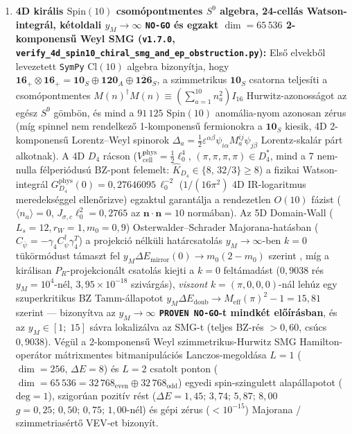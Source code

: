\documentclass[11pt,a4paper]{article}
\begin{document}
\begin{enumerate}
    Így \emph{minden} általános (nem-szimmetrikus) $W(F_4)$-invariáns 4-es rendű direktor-kinetikus tenzor automatikusan 4D euklideszi $O(4)$-izotróp mindhárom független $c_1, c_2, c_3$ kontrakcióra (kizárva a hiperkockás $\sum_\alpha(\partial_\alpha u_\alpha)^2$ ellentagokat; $D_4$-gyök ellenőrzés $4{,}44\times 10^{-16}$), míg az első $W(F_4)$ anizotrópia ($16 > 15$) csak 6-os rendben ($c_4$-típusú gyorsulási tagokban) lép be. A Lorentz-aláírású $SO(3,1)$ kontinuum a Paper~27 Wick-forgatásos/EFT előírására támaszkodik.
    \item \textbf{4D királis $\mathrm{Spin}(10)$ csomópontmentes $S^9$ algebra, 24-cellás Watson-integrál, kétoldali $y_M\to\infty$ \texttt{NO-GO} és egzakt $\dim = 65\,536$ 2-komponensű Weyl SMG (\texttt{v1.7.0}, \texttt{verify\_\allowbreak 4d\_\allowbreak spin10\_\allowbreak chiral\_\allowbreak smg\_\allowbreak and\_\allowbreak ep\_\allowbreak obstruction.py}):}
    Első elvekből levezetett \texttt{SymPy} $\mathrm{Cl}(10)$ algebra bizonyítja, hogy $\mathbf{16}_+\otimes\mathbf{16}_+=\mathbf{10}_S\oplus\mathbf{120}_A\oplus\overline{\mathbf{126}}_S$, a szimmetrikus $\mathbf{10}_S$ csatorna teljesíti a csomópontmentes $M(n)^\dagger M(n)\equiv(\sum_{a=1}^{10} n_a^2)I_{16}$ Hurwitz-azonosságot az egész $S^9$ gömbön, és mind a $91\,125$ $\mathrm{Spin}(10)$ anomália-nyom azonosan zérus (míg spinnel nem rendelkező 1-komponensű fermionokra a $\mathbf{10}_S$ kiesik, 4D 2-komponensű Lorentz--Weyl spinorok $\Delta_a=\frac{1}{2}\varepsilon^{\alpha\beta}\psi_{i\alpha}M_a^{ij}\psi_{j\beta}$ Lorentz-skalár párt alkotnak). A 4D $D_4$ rácson ($V_{\mathrm{cell}}^{\mathrm{phys}}=\frac{1}{2}\ell_0^4$, $(\pi,\pi,\pi,\pi)\in D_4^*$, mind a 7 nem-nulla félperiódusú BZ-pont felemelt: $\hat K_{D_4}\in\{8,\,32/3\}\ge 8$) a fizikai Watson-integrál $G_{D_4}^{\mathrm{phys}}(0)=0{,}27646095\,\ell_0^{-2}$ ($1/(16\pi^2)$ 4D IR-logaritmus meredekséggel ellenőrizve) egzaktul garantálja a rendezetlen $O(10)$ fázist ($\langle n_a\rangle=0$, $J_{\sigma,c}\ell_0^2=0{,}2765$ az $\mathbf{n}\cdot\mathbf{n}=10$ normában). Az 5D Domain-Wall ($L_s=12, r_W=1, m_0=0{,}9$) Osterwalder--Schrader Majorana-hatásban ($C_{\bar\psi}=-\gamma_4 C_\psi^\dagger\gamma_4^T$) a projekció nélküli határcsatolás $y_M\to\infty$-ben $k=0$ tükörmódust támaszt fel $y_M\Delta E_{\mathrm{mirror}}(0)\to m_0(2-m_0)$ szerint \cite{Golterman1993}, míg a királisan $P_R$-projekcionált csatolás kiejti a $k=0$ feltámadást ($0{,}9038$ rés $y_M=10^4$-nél, $3{,}95\times 10^{-18}$ szivárgás), \emph{viszont} $k=(\pi,0,0,0)$-nál lehúz egy szuperkritikus BZ Tamm-állapotot $y_M\Delta E_{\mathrm{doub}}\to M_{\mathrm{eff}}(\pi)^2-1=15{,}81$ szerint --- bizonyítva az \textbf{$y_M\to\infty$ \texttt{PROVEN NO-GO}-t mindkét előírásban}, és az $y_M\in[1;\; 15]$ sávra lokalizálva az SMG-t (teljes BZ-rés $>0{,}60$, csúcs $0{,}9038$). Végül a 2-komponensű Weyl szimmetrikus-Hurwitz SMG Hamilton-operátor mátrixmentes bitmanipulációs Lanczos-megoldása $L=1$ ($\dim=256$, $\Delta E=8$) és $L=2$ csatolt ponton ($\dim=65\,536 = 32\,768_{\mathrm{even}}\oplus 32\,768_{\mathrm{odd}}$) egyedi spin-szingulett alapállapotot ($\mathrm{deg}=1$), szigorúan pozitív rést ($\Delta E=1{,}45;\,3{,}74;\,5{,}87;\,8{,}00$ $g=0{,}25;\,0{,}50;\,0{,}75;\,1{,}00$-nél) és gépi zérus ($<10^{-15}$) Majorana / szimmetriasértő VEV-et bizonyít.

\end{enumerate}
\end{document}
